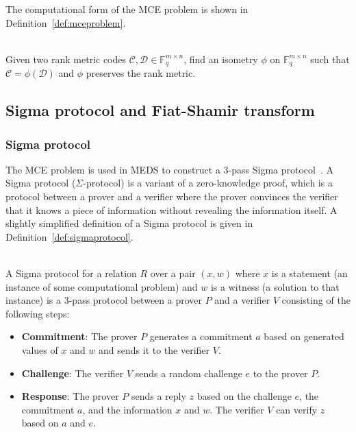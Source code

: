 \documentclass[11pt,a4paper]{report}
\theoremstyle{definition}
\begin{document}
The computational form of the MCE problem is shown in Definition~\ref{def:mceproblem}.

\begin{definition}~\\
  \label{def:mceproblem}
  Given two rank metric codes $\mathcal{C}, \mathcal{D} \in \mathbb{F}_q^{m \times n}$, find an isometry $\phi$ on $\mathbb{F}_q^{m \times n}$ such that $\mathcal{C} = \phi(\mathcal{D})$ and $\phi$ preserves the rank metric.
\end{definition}

\subsection{Sigma protocol and Fiat-Shamir transform}
\label{sec:medsworks}


\subsubsection{Sigma protocol}
\label{sec:sigmaprotocol}
The MCE problem is used in MEDS to construct a 3-pass Sigma protocol~\cite{damgaard2002sigma}. A Sigma protocol ($\Sigma$-protocol) is a variant of a zero-knowledge proof, which is a protocol between a prover and a verifier where the prover convinces the verifier that it knows a piece of information without revealing the information itself. A slightly simplified definition of a Sigma protocol is given in Definition~\ref{def:sigmaprotocol}.

\begin{definition}~\\
  \label{def:sigmaprotocol}
  A Sigma protocol for a relation $R$ over a pair $(x, w)$ where $x$ is a statement (an instance of some computational problem) and $w$ is a witness (a solution to that instance) is a 3-pass protocol between a prover $P$ and a verifier $V$ consisting of the following steps:
  \begin{itemize}
    \item \textbf{Commitment}: The prover $P$ generates a commitment $a$ based on generated values of $x$ and $w$ and sends it to the verifier $V$.
    \item \textbf{Challenge}: The verifier $V$ sends a random challenge $e$ to the prover $P$.
    \item \textbf{Response}: The prover $P$ sends a reply $z$ based on the challenge $e$, the commitment $a$, and the information $x$ and $w$. The verifier $V$ can verify $z$ based on $a$ and $e$.
  \end{itemize}
\end{definition}
\end{document}
